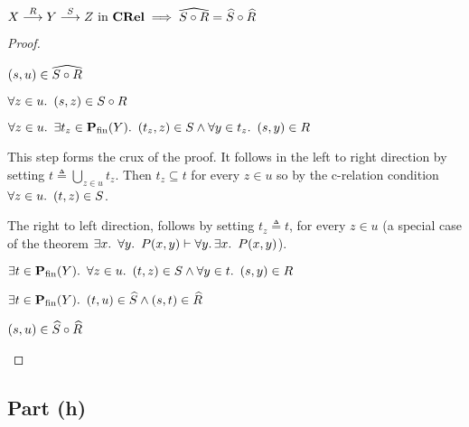 \begin{prop}\label{prop:rel-hat-comp}
  $X\overset{R}{\longrightarrow}Y\overset{S}{\longrightarrow}Z\text{ in }\mathbf{CRel}\implies\widehat{S\circ R} = \widehat{S}\circ\widehat{R}$
  \begin{proof}~\\
    \begin{itemize}
      \step
        $(s,u)\in\widehat{S\circ R}$
        \marginnote{\Hyp}

      \step[\iffs]
        $\forall z\in u\ldotp~(s,z)\in S\circ R$

      \step[\iffs]
        $\forall z\in u\ldotp~\exists t_z\in\mathbf{P}_{\operatorname{fin}}(Y)\ldotp~(t_z,z)\in S\land\forall y\in t_z\ldotp~(s,y)\in R$

        \addtolength{\itemsep}{\baselineskip}
        \step
          This step forms the crux of the proof. It follows in the left to right direction by setting $t \triangleq \bigcup\limits_{z\in u} t_z$. Then $t_z\subseteq t$ for every $z\in u$ so by the c-relation condition $\forall z\in u\ldotp~(t,z)\in S$.

        \step
          The right to left direction, follows by setting $t_z \triangleq t$, for every ${z\in u}$ (a special case of the theorem ${\exists x\ldotp~\forall y\ldotp~P(x, y)\vdash\forall y\ldotp\exists x\ldotp~P(x,y)}$).

      \step[\iffs]
        $\exists t\in\mathbf{P}_{\operatorname{fin}}(Y)\ldotp~\forall z\in u\ldotp~(t,z)\in S\land\forall y\in t\ldotp~(s,y)\in R$

        \addtolength{\itemsep}{-1\baselineskip}
      \step[\iffs]
        $\exists t\in\mathbf{P}_{\operatorname{fin}}(Y)\ldotp~(t,u)\in\widehat{S}\land (s,t)\in\widehat{R}$

      \step[\iffs]
        $(s, u)\in\widehat{S}\circ\widehat{R}$
        \qedhere

    \end{itemize}
  \end{proof}
\end{prop}

\subsection{Part (h)}\label{sec:q-2-h}

